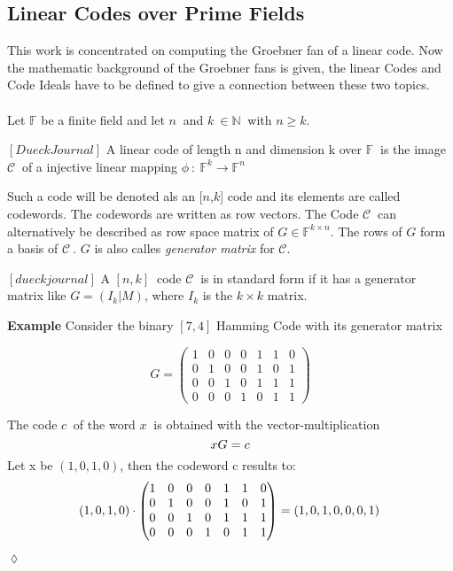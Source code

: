    



\subsection{Linear Codes over Prime Fields}
\label{subsec:linearcodes}
This work is concentrated on computing the Groebner fan of a linear code. Now the mathematic background of the Groebner fans is given, the linear Codes and Code Ideals have to be defined to give a connection between these two topics.\\ \\
Let $\mathbb{F}$ be a finite field and let $n~$ and $k~\in \mathbb{N}~$ with $n\geq k$.
\begin{env_definition}
$ [Dueck Journal ] $ A linear code of length n and dimension k over $\mathbb{F}~$ is the image $\mathcal{C}~$ of a injective linear mapping $\phi~:~\mathbb{F}^{k} \rightarrow \mathbb{F}^{n}  $
\end{env_definition} 

Such a code will be denoted als an [$n$,$k$] code and its elements are called codewords. The codewords are written 
as row vectors. The Code $\mathcal{C}~$ can alternatively be described as row space matrix of $G \in \mathbb{F}^{k \times n}$. The rows of $G$ form a basis of $\mathcal{C}~$.
$G$ is also calles \textit{generator matrix} for $\mathcal{C}$.

\begin{env_definition}
$[dueckjournal]$
A $[n,k]~$ code $\mathcal{C}~$ is in standard form if it has a generator matrix like $G = (I_{k}| M)$, where $I_{k}$ is the $k \times k$ matrix.
\end{env_definition}


\textbf{Example}
Consider the binary $[7,4]$ Hamming Code with its generator matrix

\[
G =
\begin{pmatrix}
1 & 0 & 0 & 0 & 1 & 1 & 0 \\ 
0 & 1 & 0 & 0 & 1 & 0 & 1 \\  
0 & 0 & 1 & 0 & 1 & 1 & 1 \\ 
0 & 0 & 0 & 1 & 0 & 1 & 1
\end{pmatrix} 
\]

The code $c~$ of the word $x~$ is obtained with the vector-multiplication
\[
     xG = c \\
 \]
 Let x be $\left(1,0,1,0\right)$, then the codeword c results to:
 \[
      \left(1,0,1,0\right) \cdot \begin{pmatrix}
      1 & 0 & 0 & 0 & 1 & 1 & 0 \\ 
      0 & 1 & 0 & 0 & 1 & 0 & 1 \\  
      0 & 0 & 1 & 0 & 1 & 1 & 1 \\ 
      0 & 0 & 0 & 1 & 0 & 1 & 1
      \end{pmatrix}   = \left(1,0,1,0,0,0,1\right) \\
  \]
\begin{flushright}
$\lozenge$
\end{flushright} 

